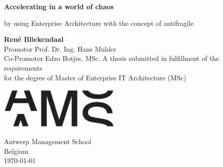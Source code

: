\begin{titlepage}
	\begin{center}
		\vspace*{1cm}
		
		\Huge
		\textbf{Accelerating in a world of chaos}
		
		\vspace{0.5cm}
		\large
		
		by using Enterprise Architecture with the concept of antifragile
		
		\vspace{1.5cm}
		\Large
		\textbf{René Bliekendaal}\\
		\vspace{0.8cm}
		Promotor Prof. Dr. Ing. Hans Mulder\\
		Co-Promotor Edzo Botjes, MSc.		
		\vfill
		\large
		A thesis submitted in fulfillment of the requirements\\
		for the degree of Master of Enterprise IT Architecture (MSc)
		
		\vspace{0.8cm}
	
			\includegraphics[width=6cm]{images/ams-logo}
		
		\vspace{0.8cm}
		
		\Large
		Antwerp Management School\\
		Belgium\\
		\today
	\end{center}
\end{titlepage}